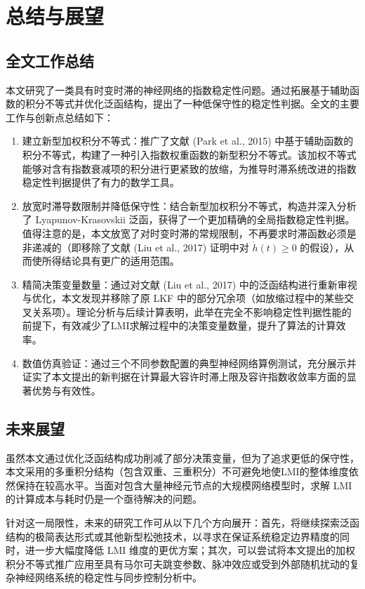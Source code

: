 \documentclass[a4paper, 12pt, oneside]{article}
\theoremstyle{cn_theorem}
\begin{document}
\section{总结与展望}

\subsection{全文工作总结}
本文研究了一类具有时变时滞的神经网络的指数稳定性问题。通过拓展基于辅助函数的积分不等式并优化泛函结构，提出了一种低保守性的稳定性判据。全文的主要工作与创新点总结如下：

\begin{enumerate}
    \item 建立新型加权积分不等式：推广了文献 (Park et al., 2015) 中基于辅助函数的积分不等式，构建了一种引入指数权重函数的新型积分不等式。该加权不等式能够对含有指数衰减项的积分进行更紧致的放缩，为推导时滞系统改进的指数稳定性判据提供了有力的数学工具。
    
    \item 放宽时滞导数限制并降低保守性：结合新型加权积分不等式，构造并深入分析了 Lyapunov-Krasovskii 泛函，获得了一个更加精确的全局指数稳定性判据。值得注意的是，本文放宽了对时变时滞的常规限制，不再要求时滞函数必须是非递减的（即移除了文献 (Liu et al., 2017) 证明中对 $\dot{h}(t) \ge 0$ 的假设），从而使所得结论具有更广的适用范围。
    
    \item 精简决策变量数量：通过对文献 (Liu et al., 2017) 中的泛函结构进行重新审视与优化，本文发现并移除了原 LKF 中的部分冗余项（如放缩过程中的某些交叉关系项）。理论分析与后续计算表明，此举在完全不影响稳定性判据性能的前提下，有效减少了LMI求解过程中的决策变量数量，提升了算法的计算效率。
    
    \item 数值仿真验证：通过三个不同参数配置的典型神经网络算例测试，充分展示并证实了本文提出的新判据在计算最大容许时滞上限及容许指数收敛率方面的显著优势与有效性。
\end{enumerate}

\subsection{未来展望}
虽然本文通过优化泛函结构成功削减了部分决策变量，但为了追求更低的保守性，本文采用的多重积分结构（包含双重、三重积分）不可避免地使LMI的整体维度依然保持在较高水平。当面对包含大量神经元节点的大规模网络模型时，求解 LMI 的计算成本与耗时仍是一个亟待解决的问题。

针对这一局限性，未来的研究工作可从以下几个方向展开：首先，将继续探索泛函结构的极简表达形式或其他新型松弛技术，以寻求在保证系统稳定边界精度的同时，进一步大幅度降低 LMI 维度的更优方案；其次，可以尝试将本文提出的加权积分不等式推广应用至具有马尔可夫跳变参数、脉冲效应或受到外部随机扰动的复杂神经网络系统的稳定性与同步控制分析中。
\end{document}
